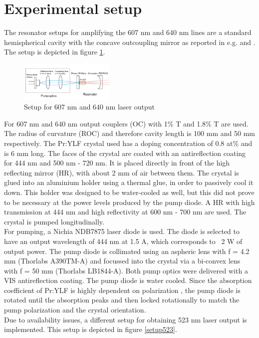\documentclass[conference]{IEEEtran}
\begin{document}
\section{Experimental setup}
The resonator setups for amplifying the 607 nm and 640 nm lines are a standard hemispherical cavity with the concave outcoupling mirror as reported in e.g. \cite{Luo.2016} and \cite{Bellancourt.2010}. The setup is depicted in figure \ref{setup607640}.
\begin{figure}[h]
	\centering
	\includegraphics[width=0.4\textwidth]{img/setup607640}
	\caption{Setup for 607 nm and 640 nm laser output}
	\label{setup607640}
\end{figure}
For 607 nm and 640 nm output couplers (OC) with 1\% T and 1.8\% T are used. The radius of curvature (ROC) and therefore cavity length is 100 mm and 50 mm respectively. The Pr:YLF crystal used has a doping concentration of 0.8 at\% and is 6 mm long. The faces of the crystal are coated with an antireflection coating for 444 nm and 500 nm - 720 nm. It is placed directly in front of the high reflecting mirror (HR), with about 2 mm of air between them. The crystal is glued into an aluminium holder using a thermal glue, in order to passively cool it down. This holder was designed to be water-cooled as well, but this did not prove to be necessary at the power levels produced by the pump diode. A HR with high transmission at 444 nm and high reflectivity at 600 nm - 700 nm are used. The crystal is pumped longitudinally.\\
For pumping, a Nichia NDB7875 laser diode is used. The diode is selected to have an output wavelength of 444 nm at 1.5 A, which corresponds to ~2 W of output power. The pump diode is collimated using an aspheric lens with f = 4.2 mm (Thorlabs A390TM-A) and focussed into the crystal via a bi-convex lens with f = 50 mm (Thorlabs LB1844-A). Both pump optics were delivered with a VIS antireflection coating. The pump diode is water cooled. Since the absorption coefficient of Pr:YLF is highly dependent on polarization \cite{Xu.2013}, the pump diode is rotated until the absorption peaks and then locked rotationally to match the pump polarization and the crystal orientation. \\
Due to availability issues, a different setup for obtaining 523 nm laser output is implemented. This setup is depicted in figure \ref{setup523}.
\end{document}
